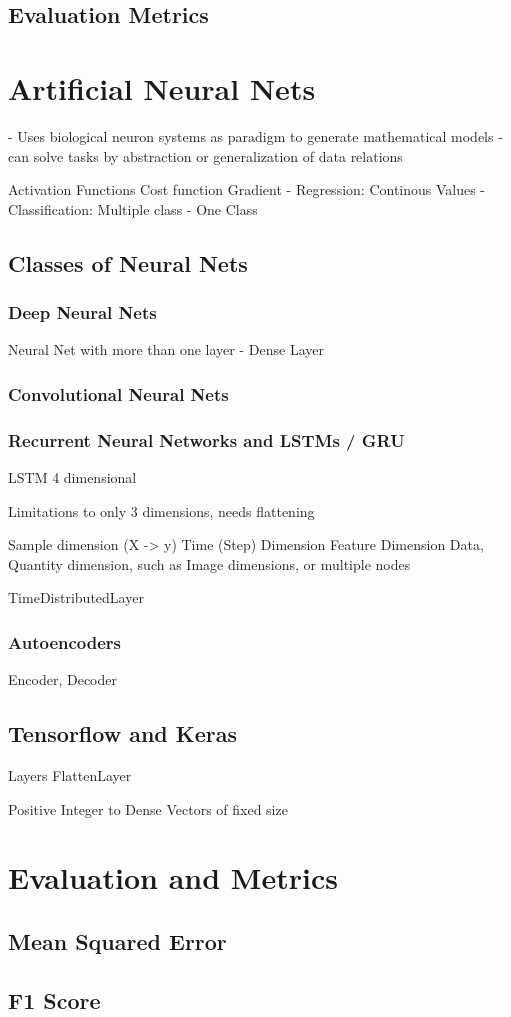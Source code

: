 \subsection{Evaluation Metrics}
\section{Artificial Neural Nets}

- Uses biological neuron systems as paradigm to generate mathematical models
- can solve tasks by abstraction or generalization of data relations


Activation Functions
Cost function
Gradient
- Regression: Continous Values
- Classification: Multiple class
- One Class

\subsection{Classes of Neural Nets}

\subsubsection{Deep Neural Nets}

Neural Net with more than one layer
- Dense Layer

\subsubsection{Convolutional Neural Nets}
\subsubsection{Recurrent Neural Networks and LSTMs / GRU}
LSTM 4 dimensional

Limitations to only 3 dimensions, needs flattening

Sample dimension (X -> y)
Time (Step) Dimension
Feature Dimension
Data, Quantity dimension, such as Image dimensions, or multiple nodes

TimeDistributedLayer

\subsubsection{Autoencoders}
\label{subsubsec:autoencoder}

Encoder, Decoder

\subsection{Tensorflow and Keras}
Layers
FlattenLayer

Positive Integer to Dense Vectors of fixed size

\section{Evaluation and Metrics}
\subsection{Mean Squared Error}
\subsection{F1 Score}
